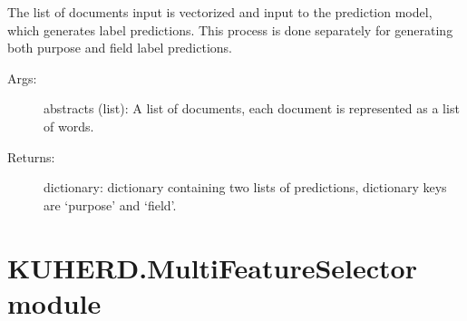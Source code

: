 \documentclass[letterpaper,10pt,english]{sphinxmanual}
\begin{document}
\begin{fulllineitems}
\begin{fulllineitems}
The list of documents input is vectorized and input to the prediction model, which generates label predictions.
This process is done separately for generating both purpose and field label predictions.
\begin{description}
\item[{Args:}] \leavevmode
abstracts (list): A list of documents, each document is represented as a list of words.

\item[{Returns:}] \leavevmode
dictionary: dictionary containing two lists of predictions, dictionary keys are `purpose' and `field'.

\end{description}

\end{fulllineitems}


\end{fulllineitems}



\section{KUHERD.MultiFeatureSelector module}
\label{\detokenize{KUHERD:kuherd-multifeatureselector-module}}\label{\detokenize{KUHERD:module-KUHERD.MultiFeatureSelector}}
\end{document}
